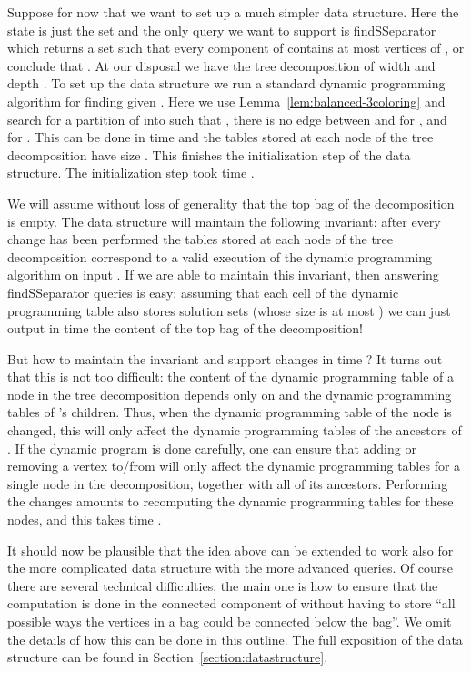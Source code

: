 \documentclass[a4paper,11pt]{article}
\theoremstyle{definition}
\theoremstyle{remark}
\newcommand{\qSsep}{\textnormal{findSSeparator}}
\begin{document}
Suppose for now that we want to set up a much simpler data structure.
Here the state is just the set  and the only query we want to
support is \qSsep{} which returns a set  such that every
component of  contains at most
 vertices of , or conclude that .  At
our disposal we have the tree decomposition  of width 
and depth .  To set up the data structure we run a standard
dynamic programming algorithm for finding  given .  Here
we use Lemma~\ref{lem:balanced-3coloring} and search for a partition
of  into  such that , there is no
edge between  and  for , and  for .  This can be done in time  and
the tables stored at each node of the tree decomposition have size
.  This finishes the initialization step of the data
structure.  The initialization step took time .

We will assume without loss of generality that the top bag of the
decomposition is empty.  The data structure will maintain the
following invariant: after every change has been performed the tables
stored at each node of the tree decomposition correspond to a valid
execution of the dynamic programming algorithm on input .  If
we are able to maintain this invariant, then answering \qSsep{}
queries is easy: assuming that each cell of the dynamic programming
table also stores solution sets (whose size is at most ) we can
just output in time  the content of the top bag of the
decomposition!

But how to maintain the invariant and support changes in time
? It turns out that this is not too difficult: the
content of the dynamic programming table of a node  in the tree
decomposition depends only on  and the dynamic programming tables
of 's children.  Thus, when the dynamic programming table of the
node  is changed, this will only affect the dynamic programming
tables of the  ancestors of .  If the dynamic program is
done carefully, one can ensure that adding or removing a vertex
to/from  will only affect the dynamic programming tables for a
single node  in the decomposition, together with all of its  ancestors.  Performing the changes amounts to recomputing the
dynamic programming tables for these nodes, and this takes time
.

It should now be plausible that the idea above can be extended to work
also for the more complicated data structure with the more advanced
queries.  Of course there are several technical difficulties, the main
one is how to ensure that the computation is done in the connected
component  of  without having to store ``all
possible ways the vertices in a bag could be connected below the
bag''.  We omit the details of how this can be done in this outline.
The full exposition of the data structure can be found in
Section~\ref{section:datastructure}.
\end{document}
